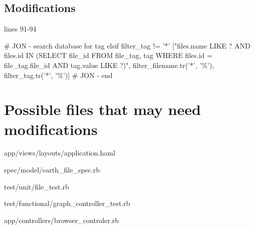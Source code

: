 \documentclass[a4paper,10pt]{article}
\begin{document}
\subsection*{Modifications}
lines 91-94

     \# JON - search database for tag
      elsif filter\_tag != '*'
        ["files.name LIKE ? AND files.id IN (SELECT file\_id FROM file\_tag, tag WHERE files.id = file\_tag.file\_id AND tag.value LIKE ?)", filter\_filename.tr('*', '\%'), filter\_tag.tr('*', '\%')]
      \# JON - end


\section{Possible files that may need modifications}
\begin{description}
 \item app/views/layouts/application.haml
 \item spec/model/earth\_file\_spec.rb
 \item test/unit/file\_test.rb
 \item test/functional/graph\_controller\_test.rb
 \item app/controllers/browser\_controler.rb
 \end{description}
\end{document}
